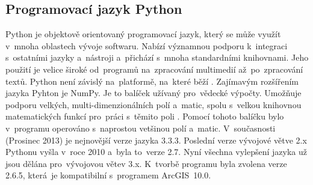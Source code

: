 



% 

\subsection{Programovací jazyk Python} \label{sec:python}
  Python je objektově orientovaný programovací jazyk, který se může využít v~mnoha oblastech vývoje softwaru. Nabízí významnou podporu k~integraci s~ostatními jazyky a~nástroji a~přichází s~mnoha standardními knihovnami. Jeho použití je velice široké od~programů na~zpracování multimedií až~po~zpracování textů. Python není závislý na~platformě, na~které běží \cite{python}. Zajímavým rozšířením jazyka Pyhton je NumPy. Je to balíček užívaný pro~vědecké výpočty. Umožňuje podporu velkých, multi-dimenzionálních polí a~matic, spolu s~velkou knihovnou matematických funkcí pro~práci s~těmito poli \cite{numpy}. Pomocí tohoto balíčku bylo v~programu operováno s~naprostou vetšinou polí a~matic. V~současnosti (Prosinec 2013) je nejnovější verze jazyka 3.3.3. Poslední verze vývojové větve 2.x Pythonu vyšla v~roce 2010 a~byla to~verze 2.7. Nyní všechna vylepšení jazyka už jsou dělána pro~vývojovou větev 3.x. K~tvorbě programu byla zvolena verze 2.6.5, která~je kompatibilní s~programem ArcGIS~10.0.     

